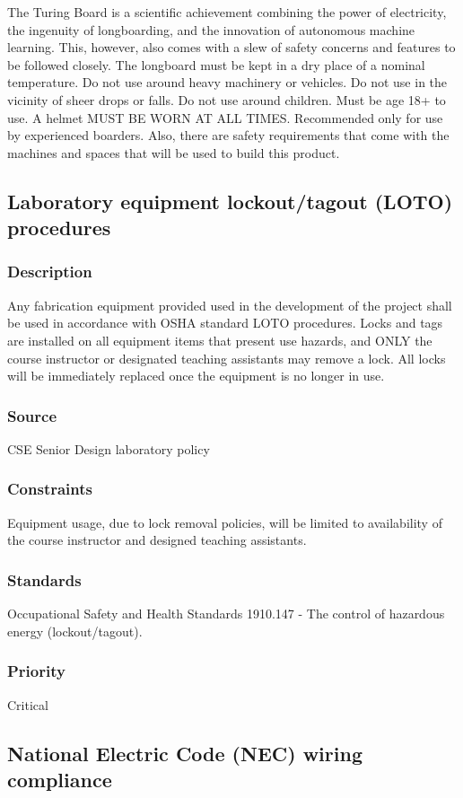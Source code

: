 The Turing Board is a scientific achievement combining the power of electricity, the ingenuity of longboarding, and the innovation of autonomous machine learning. This, however, also comes with a slew of safety concerns and features to be followed closely. The longboard must be kept in a dry place of a nominal temperature. Do not use around heavy machinery or vehicles. Do not use in the vicinity of sheer drops or falls. Do not use around children. Must be age 18+ to use. A helmet MUST BE WORN AT ALL TIMES. Recommended only for use by experienced boarders. Also, there are safety requirements that come with the machines and spaces that will be used to build this product. 

\subsection{Laboratory equipment lockout/tagout (LOTO) procedures}
\subsubsection{Description}
Any fabrication equipment provided used in the development of the project shall be used in accordance with OSHA standard LOTO procedures. Locks and tags are installed on all equipment items that present use hazards, and ONLY the course instructor or designated teaching assistants may remove a lock. All locks will be immediately replaced once the equipment is no longer in use.
\subsubsection{Source}
CSE Senior Design laboratory policy
\subsubsection{Constraints}
Equipment usage, due to lock removal policies, will be limited to availability of the course instructor and designed teaching assistants.
\subsubsection{Standards}
Occupational Safety and Health Standards 1910.147 - The control of hazardous energy (lockout/tagout).
\subsubsection{Priority}
Critical

\subsection{National Electric Code (NEC) wiring compliance}

